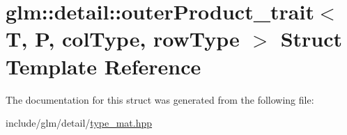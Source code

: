 \hypertarget{structglm_1_1detail_1_1outerProduct__trait}{}\section{glm\+:\+:detail\+:\+:outer\+Product\+\_\+trait$<$ T, P, col\+Type, row\+Type $>$ Struct Template Reference}
\label{structglm_1_1detail_1_1outerProduct__trait}


The documentation for this struct was generated from the following file\+:\begin{DoxyCompactItemize}
\item 
include/glm/detail/\hyperlink{type__mat_8hpp}{type\+\_\+mat.\+hpp}\end{DoxyCompactItemize}
